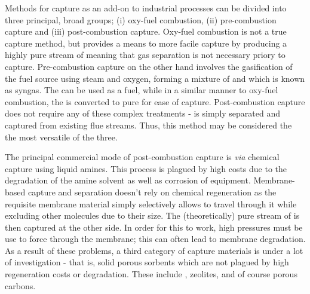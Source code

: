Methods for  capture as an add-on to industrial processes can be divided into three principal, broad groups; (i) oxy-fuel combustion, (ii) pre-combustion capture and (iii) post-combustion capture.\citep{kanniche2010pre} Oxy-fuel combustion is not a true  capture method, but provides a means to more facile  capture by producing a highly pure stream of  meaning that gas separation is not necessary priory to capture.\citep{stanger2015oxyfuel, wall2009overview} Pre-combustion capture on the other hand involves the gasification of the fuel source using steam and oxygen, forming a mixture of  and  which is known as syngas. The  can be used as a fuel, while in a similar manner to oxy-fuel combustion, the  is converted to pure  for ease of capture.\citep{jansen2015pre} Post-combustion capture does not require any of these complex treatments -  is simply separated and captured from existing flue streams.\citep{wang2017review, samanta2012post} Thus, this method may be considered the the most versatile of the three.

The principal commercial mode of post-combustion  capture is \textit{via} chemical capture using liquid amines. This process is plagued by high costs due to the degradation of the amine solvent as well as corrosion of equipment.\citep{aronu2009solvent, dutcher2015amine, delgado2018degradation} Membrane-based  capture and separation doesn't rely on chemical regeneration as the requisite membrane material simply selectively allows  to travel through it while excluding other molecules due to their size.\citep{adewole2013current, ramasubramanian2011recent} The (theoretically) pure stream of  is then captured at the other side. In order for this to work, high pressures must be use to force  through the membrane; this can often lead to membrane degradation.\citep{powell2006polymeric} As a result of these problems, a third category of  capture materials is under a lot of investigation - that is, solid porous sorbents which are not plagued by high regeneration costs or degradation. These include ,\citep{Ding2019Carbon, qian2020mof} zeolites,\citep{Siriwardane2005Adsorption, Krishna2010silico} and of course porous carbons.\citep{Zhu2015Naturally, Chen2019Template, Xia2011Superior, Sevilla2016Highly} 

